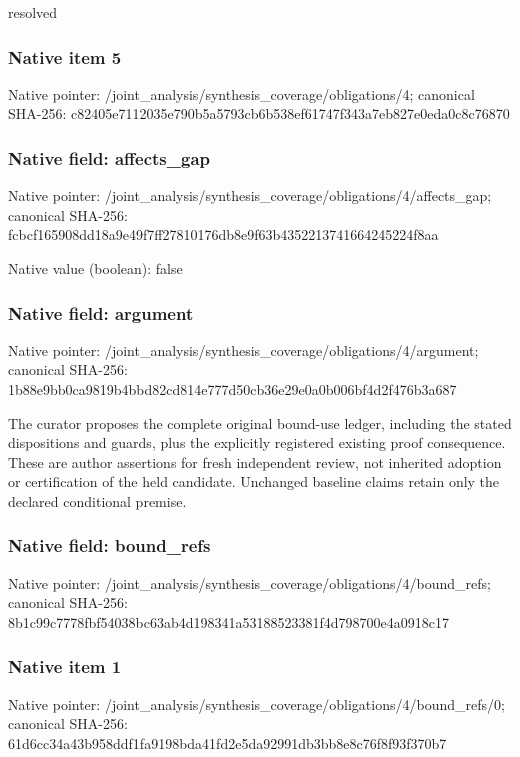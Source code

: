 \documentclass[10pt,a4paper]{article}
\begin{document}
\begingroup\raggedright\sloppy resolved\par\endgroup

\subsubsection{Native item 5}
Native pointer: /joint\_\allowbreak{}analysis/synthesis\_\allowbreak{}coverage/obligations/4; canonical SHA-256: c82405e7112035e790b5a5793cb6b538ef61747f343a7eb827e0eda0c8c76870

\subsubsection{Native field: affects\_\allowbreak{}gap}
Native pointer: /joint\_\allowbreak{}analysis/synthesis\_\allowbreak{}coverage/obligations/4/affects\_\allowbreak{}gap; canonical SHA-256: fcbcf165908dd18a9e49f7ff27810176db8e9f63b4352213741664245224f8aa

Native value (boolean): false

\subsubsection{Native field: argument}
Native pointer: /joint\_\allowbreak{}analysis/synthesis\_\allowbreak{}coverage/obligations/4/argument; canonical SHA-256: 1b88e9bb0ca9819b4bbd82cd814e777d50cb36e29e0a0b006bf4d2f476b3a687

\begingroup\raggedright\sloppy The curator proposes the complete original bound-use ledger,\allowbreak{} including the stated dispositions and guards,\allowbreak{} plus the explicitly registered existing proof consequence. These are author assertions for fresh independent review,\allowbreak{} not inherited adoption or certification of the held candidate. Unchanged baseline claims retain only the declared conditional premise.\par\endgroup

\subsubsection{Native field: bound\_\allowbreak{}refs}
Native pointer: /joint\_\allowbreak{}analysis/synthesis\_\allowbreak{}coverage/obligations/4/bound\_\allowbreak{}refs; canonical SHA-256: 8b1c99c7778fbf54038bc63ab4d198341a53188523381f4d798700e4a0918c17

\subsubsection{Native item 1}
Native pointer: /joint\_\allowbreak{}analysis/synthesis\_\allowbreak{}coverage/obligations/4/bound\_\allowbreak{}refs/0; canonical SHA-256: 61d6cc34a43b958ddf1fa9198bda41fd2e5da92991db3bb8e8c76f8f93f370b7
\end{document}
